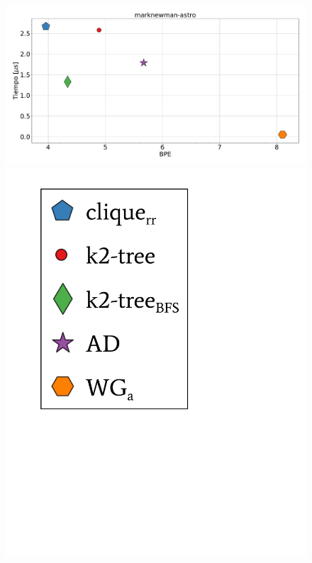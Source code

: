 \begin{figure}
    	\centering
    	\begin{minipage}{1\textwidth}
    			\centering
    			\begin{minipage}{0.8\textwidth}
    				\centering
    				\includegraphics[width=1\linewidth]{img/bpeTimes/aleatorio/marknewman-astro.pdf}
    			\end{minipage}
    			\begin{minipage}{0.15\textwidth}
    				\centering
    				\includegraphics[scale=.24, clip, trim=70 300 230 30]{img/bpeTimes/labelAle.pdf}
    			\end{minipage}
    			

\end{minipage}
\end{figure}
